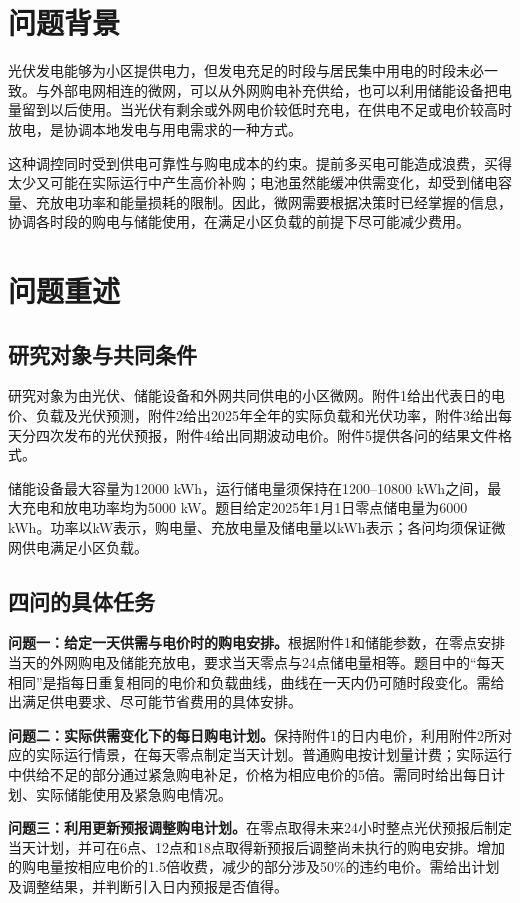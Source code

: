 \section{问题背景}
光伏发电能够为小区提供电力，但发电充足的时段与居民集中用电的时段未必一致。与外部电网相连的微网，可以从外网购电补充供给，也可以利用储能设备把电量留到以后使用。当光伏有剩余或外网电价较低时充电，在供电不足或电价较高时放电，是协调本地发电与用电需求的一种方式。

这种调控同时受到供电可靠性与购电成本的约束。提前多买电可能造成浪费，买得太少又可能在实际运行中产生高价补购；电池虽然能缓冲供需变化，却受到储电容量、充放电功率和能量损耗的限制。因此，微网需要根据决策时已经掌握的信息，协调各时段的购电与储能使用，在满足小区负载的前提下尽可能减少费用。

\section{问题重述}
\subsection{研究对象与共同条件}
研究对象为由光伏、储能设备和外网共同供电的小区微网。附件1给出代表日的电价、负载及光伏预测，附件2给出2025年全年的实际负载和光伏功率，附件3给出每天分四次发布的光伏预报，附件4给出同期波动电价。附件5提供各问的结果文件格式。

储能设备最大容量为12000 kWh，运行储电量须保持在1200--10800 kWh之间，最大充电和放电功率均为5000 kW。题目给定2025年1月1日零点储电量为6000 kWh。功率以kW表示，购电量、充放电量及储电量以kWh表示；各问均须保证微网供电满足小区负载。

\subsection{四问的具体任务}
\textbf{问题一：给定一天供需与电价时的购电安排。}根据附件1和储能参数，在零点安排当天的外网购电及储能充放电，要求当天零点与24点储电量相等。题目中的“每天相同”是指每日重复相同的电价和负载曲线，曲线在一天内仍可随时段变化。需给出满足供电要求、尽可能节省费用的具体安排。

\textbf{问题二：实际供需变化下的每日购电计划。}保持附件1的日内电价，利用附件2所对应的实际运行情景，在每天零点制定当天计划。普通购电按计划量计费；实际运行中供给不足的部分通过紧急购电补足，价格为相应电价的5倍。需同时给出每日计划、实际储能使用及紧急购电情况。

\textbf{问题三：利用更新预报调整购电计划。}在零点取得未来24小时整点光伏预报后制定当天计划，并可在6点、12点和18点取得新预报后调整尚未执行的购电安排。增加的购电量按相应电价的1.5倍收费，减少的部分涉及50\%的违约电价。需给出计划及调整结果，并判断引入日内预报是否值得。

